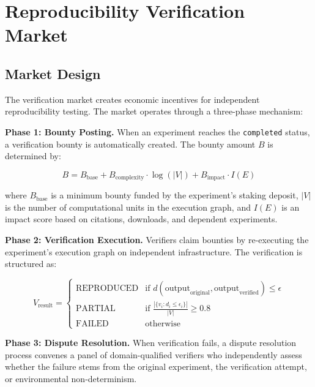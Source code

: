 \documentclass[11pt,a4paper]{article}
\begin{document}
\section{Reproducibility Verification Market}
\label{sec:market}

\subsection{Market Design}

The verification market creates economic incentives for independent reproducibility testing.
The market operates through a three-phase mechanism:

\textbf{Phase 1: Bounty Posting.}
When an experiment reaches the \texttt{completed} status, a verification bounty is automatically created.
The bounty amount $B$ is determined by:

\begin{equation}
    B = B_{\text{base}} + B_{\text{complexity}} \cdot \log(|V|) + B_{\text{impact}} \cdot I(E)
\end{equation}

\noindent where $B_{\text{base}}$ is a minimum bounty funded by the experiment's staking deposit, $|V|$ is the number of computational units in the execution graph, and $I(E)$ is an impact score based on citations, downloads, and dependent experiments.

\textbf{Phase 2: Verification Execution.}
Verifiers claim bounties by re-executing the experiment's execution graph on independent infrastructure.
The verification is structured as:

\begin{equation}
    V_{\text{result}} = \begin{cases}
        \text{REPRODUCED} & \text{if } d(\text{output}_{\text{original}}, \text{output}_{\text{verified}}) \leq \epsilon \\
        \text{PARTIAL} & \text{if } \frac{|\{v_i : d_i \leq \epsilon_i\}|}{|V|} \geq 0.8 \\
        \text{FAILED} & \text{otherwise}
    \end{cases}
\end{equation}

\textbf{Phase 3: Dispute Resolution.}
When verification fails, a dispute resolution process convenes a panel of domain-qualified verifiers who independently assess whether the failure stems from the original experiment, the verification attempt, or environmental non-determinism.
\end{document}
